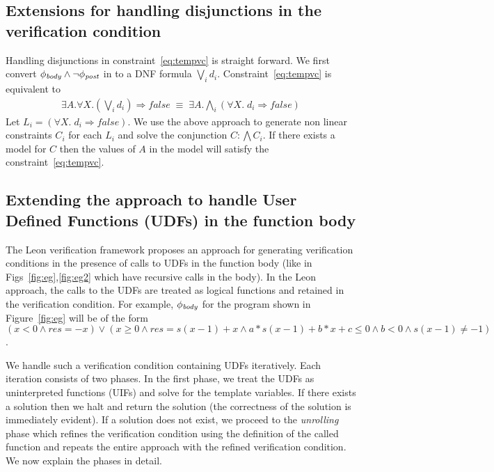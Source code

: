 \documentclass[a4paper,10pt]{article}
\begin{document}
\subsection{Extensions for handling disjunctions in the verification condition}

Handling disjunctions in constraint~\ref{eq:tempvc} is straight forward. We first
convert $\mathit{\phi_{body}} \wedge \neg \mathit{\phi_{post}}$ in to a DNF formula $\bigvee_i d_i$.
Constraint~\ref{eq:tempvc} is equivalent to 
%
\begin{align}
\exists A. \forall X. (\bigvee_i d_i) \Rightarrow false \;
\equiv \; \exists A. \bigwedge_i (\forall X. \; d_i \Rightarrow false)
\end{align}
%
Let $L_i =  (\forall X. \; d_i \Rightarrow false)$. We use the above approach to generate non linear constraints $C_i$ for each $L_i$ and solve the conjunction $C: \bigwedge C_i$.
If there exists a model for $C$ then the values of $A$ in the model will satisfy the 
constraint~\ref{eq:tempvc}.

\subsection{Extending the approach to handle User Defined Functions (UDFs) in the function body}

The Leon verification framework proposes an approach for generating verification conditions in the presence of calls to UDFs in the function body (like in Figs~\ref{fig:eg},\ref{fig:eg2} which have recursive calls in the body). In the Leon approach, the calls to the UDFs are treated as logical functions and retained in the verification condition. For example, $\mathit{\phi_{body}}$ for the program shown in Figure~\ref{fig:eg} will  be of the form 
$(x < 0 \wedge res = -x) \vee (x \ge 0 \wedge res = s(x-1) + x \wedge a*s(x-1) + b*x + c \le 0 \wedge b < 0 \wedge s(x-1) \ne -1)$.

We handle such a verification condition containing UDFs iteratively. Each iteration consists of two phases. In the first phase, we treat the UDFs as uninterpreted functions (UIFs) and solve for the template variables.
If there exists a solution then we halt and return the solution (the correctness of the solution is immediately evident).
If a solution does not exist, we proceed to the \emph{unrolling} phase which refines the verification condition using the definition of the called function and repeats the entire approach with the refined verification condition. We now explain the phases in detail.
\end{document}
